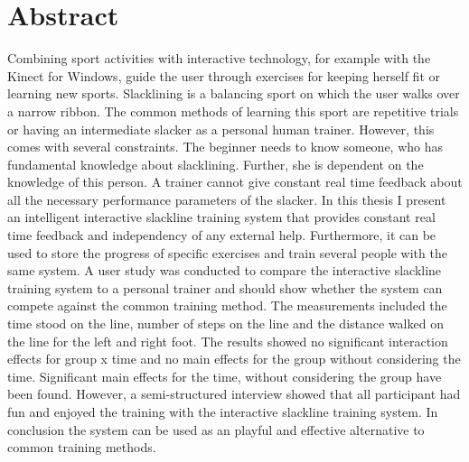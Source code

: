 \section*{Abstract}
\begin{comment}
- Einleitung
- Problem/Ziele
- Vorgesteller lösungsansatz
-- Exergame
-- SLS
-- Real time feedback
- einbau methodischer reihe als lernmethodik
- vergleich zu üblichen personal trainer
- Messung
- Results
- Conclusion

- trend von interaktiven lernmethodiken in allen bereichen des sports
- nichts vergeichbares in slacklinen
- Führen des nutzers mithilfe einer bestimmten lernmethodik und routine
- studie
\end{comment}
Combining sport activities with interactive technology, for example with the Kinect for Windows, guide the user through exercises for keeping herself fit or learning new sports.
Slacklining is a balancing sport on which the user walks over a narrow ribbon.
The common methods of learning this sport are repetitive trials or having an intermediate slacker as a personal human trainer.
However, this comes with several constraints. 
The beginner needs to know someone, who has fundamental knowledge about slacklining.
Further, she is dependent on the knowledge of this person.
A trainer cannot give constant real time feedback about all the necessary performance parameters of the slacker.
In this thesis I present an intelligent interactive slackline training system that provides constant real time feedback and independency of any external help.
Furthermore, it can be used to store the progress of specific exercises and train several people with the same system.
A user study was conducted to compare the interactive slackline training system to a personal trainer and should show whether the system can compete against the common training method.
The measurements included the time stood on the line, number of steps on the line and the distance walked on the line for the left and right foot.
The results showed no significant interaction effects for group x time and no main effects for the group without considering the time.
Significant main effects for the time, without considering the group have been found.
However, a semi-structured interview showed that all participant had fun and enjoyed the training with the interactive slackline training system.
In conclusion the system can be used as an playful and effective alternative to common training methods.

